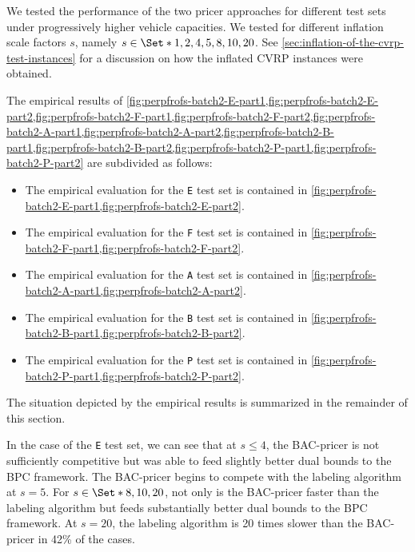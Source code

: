 We tested the performance of the two pricer approaches for different test sets under progressively higher vehicle capacities.
We tested for different inflation scale factors $s$, namely $s \in \Set*{1, 2, 4, 5, 8, 10, 20}$.
See \cref{sec:inflation-of-the-cvrp-test-instances} for a discussion on how the inflated CVRP instances were obtained.

The empirical results of
\cref{fig:perpfrofs-batch2-E-part1,fig:perpfrofs-batch2-E-part2,fig:perpfrofs-batch2-F-part1,fig:perpfrofs-batch2-F-part2,fig:perpfrofs-batch2-A-part1,fig:perpfrofs-batch2-A-part2,fig:perpfrofs-batch2-B-part1,fig:perpfrofs-batch2-B-part2,fig:perpfrofs-batch2-P-part1,fig:perpfrofs-batch2-P-part2}
are subdivided as follows:
\begin{itemize}
	\setlength{\itemsep}{0pt}
	\setlength{\parskip}{0pt}

	\item The empirical evaluation for the \texttt{E} test set is contained in \cref{fig:perpfrofs-batch2-E-part1,fig:perpfrofs-batch2-E-part2}.
	\item The empirical evaluation for the \texttt{F} test set is contained in \cref{fig:perpfrofs-batch2-F-part1,fig:perpfrofs-batch2-F-part2}.
	\item The empirical evaluation for the \texttt{A} test set is contained in \cref{fig:perpfrofs-batch2-A-part1,fig:perpfrofs-batch2-A-part2}.
	\item The empirical evaluation for the \texttt{B} test set is contained in \cref{fig:perpfrofs-batch2-B-part1,fig:perpfrofs-batch2-B-part2}.
	\item The empirical evaluation for the \texttt{P} test set is contained in \cref{fig:perpfrofs-batch2-P-part1,fig:perpfrofs-batch2-P-part2}.
\end{itemize}

The situation depicted by the empirical results is summarized in the remainder of this section.

\medskip

In the case of the \texttt{E} test set, we can see that at $s \le 4$, the BAC-pricer is not sufficiently competitive but was able to feed slightly better dual bounds to the BPC framework.
The BAC-pricer begins to compete with the labeling algorithm at $s = 5$.
For $s \in \Set*{8, 10, 20}$, not only is the BAC-pricer faster than the labeling algorithm but feeds substantially better dual bounds to the BPC framework.
At $s = 20$, the labeling algorithm is 20 times slower than the BAC-pricer in 42\% of the cases.

